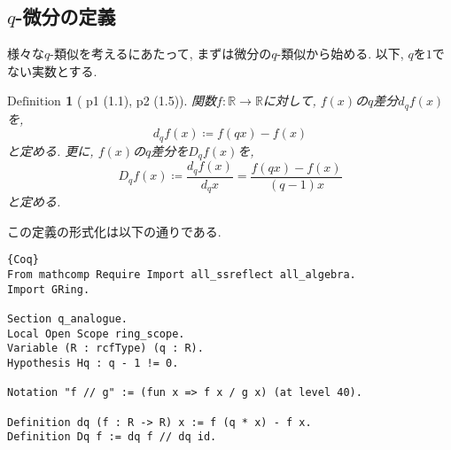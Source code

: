 \documentclass[11pt]{jarticle}
\theoremstyle{mystyle}
\newtheorem{df}{$\textrm{Definition}$}[subsection]
\newcommand{\bdf}{\begin{shadebox} \begin{df}}
\newcommand{\edf}{\end{df} \end{shadebox}}
\newcommand{\R}{\mathbb{R}}
\newcommand{\0}{\textbf{0}}
\newcommand{\1}{\textbf{1}}
\newcommand{\2}{\textbf{2}}
\begin{document}
\subsection{$q$-微分の定義}
様々な$q$-類似を考えるにあたって, まずは微分の$q$-類似から始める. 以下, $q$を$1$でない実数とする. 
\bdf[\cite{Kac} p1 (1.1), p2 (1.5)]
  関数$f : \R \to \R$に対して, $f(x)$の$q$差分$d_q f(x)$を, 
  \[
    d_q f(x) \coloneqq f (qx) - f(x)
  \]
  と定める. 更に, $f(x)$の$q$差分を$D_q f(x)$を, 
  \[
    D_q f(x) \coloneqq \frac{d_q f(x)}{d_q x} = \frac{f(qx) - f(x)}{(q - 1) x}
  \]
  と定める. 
\edf
この定義の形式化は以下の通りである.  
\begin{lstlisting}{Coq}
From mathcomp Require Import all_ssreflect all_algebra.
Import GRing.

Section q_analogue.
Local Open Scope ring_scope.
Variable (R : rcfType) (q : R).
Hypothesis Hq : q - 1 != 0.

Notation "f // g" := (fun x => f x / g x) (at level 40).

Definition dq (f : R -> R) x := f (q * x) - f x.
Definition Dq f := dq f // dq id. \end{lstlisting}
\end{document}
